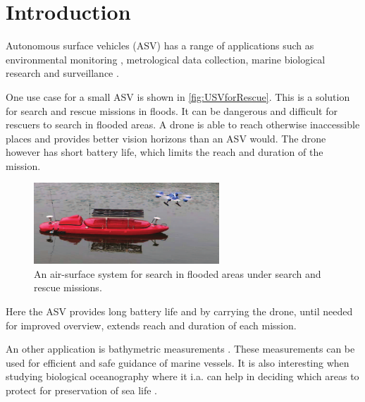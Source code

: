 \chapter{Introduction}

Autonomous surface vehicles (ASV) has a range of applications such as environmental monitoring \cite[p. 745]{MAHsieh}, metrological data collection, marine biological research and surveillance \cite[p. 8-10]{FFahimi}.

One use case for a small ASV is shown in \autoref{fig:USVforRescue}. This is a solution for search and rescue missions in floods. It can be dangerous and difficult for rescuers to search in flooded areas. A drone is able to reach otherwise inaccessible places and provides better vision horizons than an ASV would. The drone however has short battery life, which limits the reach and duration of the mission.
%
\begin{figure}[H]
  \vspace{3mm}
  \includegraphics[width=0.62\textwidth]{figures/USVforRescue.pdf}
  \caption{An air-surface system for search in flooded areas under search and rescue missions.\cite{JZhang}}
  \label{fig:USVforRescue}
\end{figure}
\vspace{-6mm}
%
Here the ASV provides long battery life and by carrying the drone, until needed for improved overview, extends reach and duration of each mission.\cite{JZhang}

An other application is bathymetric measurements \cite{MBibuli}. These measurements can be used for efficient and safe guidance of marine vessels. It is also interesting when studying biological oceanography where it i.a. can help in deciding which areas to protect for preservation of sea life \cite{NOService}.

